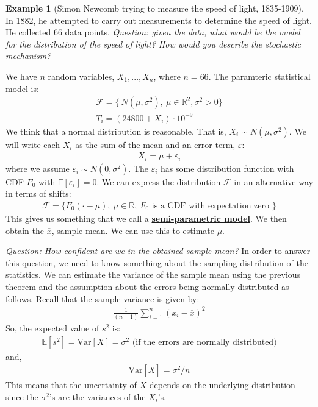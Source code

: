 \documentclass[11pt]{scrartcl}
\newcommand{\R}[0]{\mathbb{R}}
\theoremstyle{definition}
\newtheorem{ex}{Example}
\theoremstyle{remark}
\newcommand{\dfn}[1]{\textbf{\underline{#1}}}
\newcommand{\dist}[0]{\mathcal{F}}
\newcommand{\svar}[0]{\frac{1}{(n-1)} \sum_{i=1}^n (x_i - \overline{x})^2}
\newcommand{\EX}[1]{\mathbb{E}\left[#1 \right]}
\begin{document}
\begin{ex}[Simon Newcomb trying to measure the speed of light, 1835-1909] In 1882, he attempted to carry out measurements to determine the speed of light. He collected 66 data points. \emph{Question: given the data, what would be the model for the distribution of the speed of light? How would you describe the stochastic mechanism?} 

We have $n$ random variables, $X_1, ..., X_n$, where $n=66$. The paramteric statistical model is: 
\begin{align*}
	\dist = \{\ N(\mu, \sigma^2),\ \mu \in \R^2, \sigma^2 > 0 \} 	\\
	T_i = (24800 + X_i) \cdot 10^{-9} 
\end{align*}
We think that a normal distribution is reasonable. That is, $X_i \sim N(\mu, \sigma^2)$. We will write each $X_i$ as the sum of the mean and an error term, $\varepsilon$: 
\begin{align*}
	X_i = \mu + \varepsilon_i 	
\end{align*}
where we assume $\varepsilon_i \sim N(0, \sigma^2)$. The $\varepsilon_i$ has some distribution function with CDF $F_0$ with $\EX{ \varepsilon_i } = 0$. We can express the distribution $\dist$ in an alternative way in terms of shifts: 
\begin{align*}
\dist = \{ F_0 ( \cdot - \mu),\ \mu \in \R,\ F_0 \text{ is a CDF with expectation zero } \} 	
\end{align*}
This gives us something that we call a \dfn{semi-parametric model}. We then obtain the $\overline{x}$, sample mean. We can use this to estimate $\mu$. 

\emph{Question: How confident are we in the obtained sample mean?} In order to answer this question, we need to know something about the sampling distribution of the statistics. We can estimate the variance of the sample mean using the previous theorem and the assumption about the errors being normally distributed as follows. Recall that the sample variance is given by: 
\begin{align*}	
	\svar 
\end{align*}
So, the expected value of $s^2$ is: 
\begin{align*}
	\EX{s^2} = \text{Var}[X] = \sigma^2 \text{ (if the errors are normally distributed)} 
\end{align*}
and, 
\begin{align*}
	\text{Var}[\overline{X} ] = \sigma^2 / n 	
\end{align*}
This means that the uncertainty of $\overline{X}$ depends on the underlying distribution since the $\sigma^2$'s are the variances of the $X_i$'s. 
\end{ex}
\end{document}
